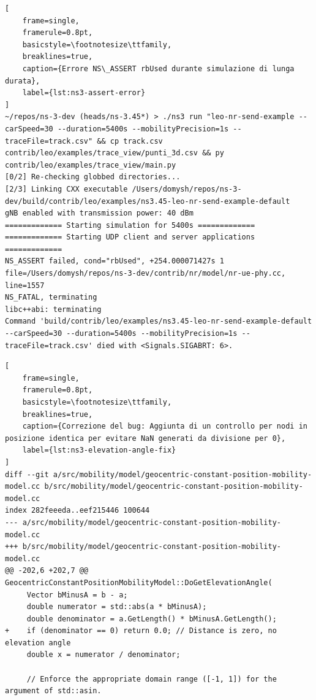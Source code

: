 \documentclass[12pt,a4paper]{article}
\begin{document}
\begin{lstlisting}[
    frame=single,
    framerule=0.8pt,
    basicstyle=\footnotesize\ttfamily,
    breaklines=true,
    caption={Errore NS\_ASSERT rbUsed durante simulazione di lunga durata},
    label={lst:ns3-assert-error}
]
~/repos/ns-3-dev (heads/ns-3.45*) > ./ns3 run "leo-nr-send-example --carSpeed=30 --duration=5400s --mobilityPrecision=1s --traceFile=track.csv" && cp track.csv contrib/leo/examples/trace_view/punti_3d.csv && py contrib/leo/examples/trace_view/main.py
[0/2] Re-checking globbed directories...
[2/3] Linking CXX executable /Users/domysh/repos/ns-3-dev/build/contrib/leo/examples/ns3.45-leo-nr-send-example-default
gNB enabled with transmission power: 40 dBm
============= Starting simulation for 5400s =============
============= Starting UDP client and server applications =============
NS_ASSERT failed, cond="rbUsed", +254.000071427s 1 file=/Users/domysh/repos/ns-3-dev/contrib/nr/model/nr-ue-phy.cc, line=1557
NS_FATAL, terminating
libc++abi: terminating
Command 'build/contrib/leo/examples/ns3.45-leo-nr-send-example-default --carSpeed=30 --duration=5400s --mobilityPrecision=1s --traceFile=track.csv' died with <Signals.SIGABRT: 6>.
\end{lstlisting}

\begin{lstlisting}[
    frame=single,
    framerule=0.8pt,
    basicstyle=\footnotesize\ttfamily,
    breaklines=true,
    caption={Correzione del bug: Aggiunta di un controllo per nodi in posizione identica per evitare NaN generati da divisione per 0},
    label={lst:ns3-elevation-angle-fix}
]
diff --git a/src/mobility/model/geocentric-constant-position-mobility-model.cc b/src/mobility/model/geocentric-constant-position-mobility-model.cc
index 282feeeda..eef215446 100644
--- a/src/mobility/model/geocentric-constant-position-mobility-model.cc
+++ b/src/mobility/model/geocentric-constant-position-mobility-model.cc
@@ -202,6 +202,7 @@ GeocentricConstantPositionMobilityModel::DoGetElevationAngle(
     Vector bMinusA = b - a;
     double numerator = std::abs(a * bMinusA);
     double denominator = a.GetLength() * bMinusA.GetLength();
+    if (denominator == 0) return 0.0; // Distance is zero, no elevation angle
     double x = numerator / denominator;

     // Enforce the appropriate domain range ([-1, 1]) for the argument of std::asin.
\end{lstlisting}

\cleardoublepage


\end{document}
